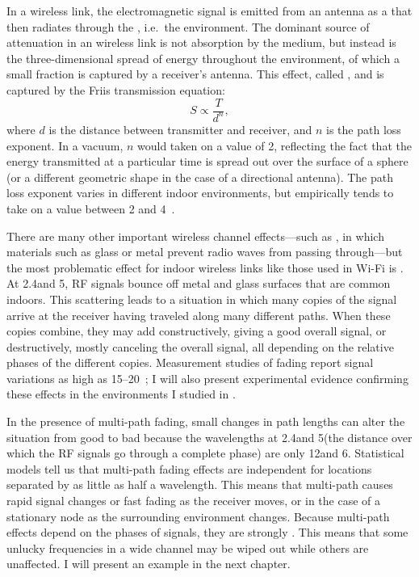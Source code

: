 In a wireless link, the electromagnetic signal is emitted from an antenna as a  that then radiates through the , i.e.\ the environment. The dominant source of attenuation in an wireless link is not absorption by the medium, but instead is the three-dimensional spread of energy throughout the environment, of which a small fraction is captured by a receiver's antenna. This effect, called , and is captured by the Friis transmission equation:
\begin{equation}
\label{eq:friis}
	S \propto \frac{T}{d^n},
\end{equation}
where $d$ is the distance between transmitter and receiver, and $n$ is the path loss exponent. In a vacuum, $n$ would taken on a value of 2, reflecting the fact that the energy transmitted at a particular time is spread out over the surface of a sphere (or a different geometric shape in the case of a directional antenna). The path loss exponent varies in different indoor environments, but empirically tends to take on a value between 2 and 4~\cite{Sklar}.

There are many other important wireless channel effects---such as , in which materials such as glass or metal prevent radio waves from passing through---but the most problematic effect for indoor wireless links like those used in Wi-Fi is . At 2.4\GHz and 5\GHz, RF signals bounce off metal and glass surfaces that are common indoors. This scattering leads to a situation in which many copies of the signal arrive at the receiver having traveled along many different paths. When these copies combine, they may add constructively, giving a good overall signal, or destructively, mostly canceling the overall signal, all depending on the relative phases of the different copies. Measurement studies of fading report signal variations as high as 15--20\dB~\cite{Judd_CHARM}; I will also present experimental evidence confirming these effects in the environments I studied in .

In the presence of multi-path fading, small changes in path lengths can alter the situation from good to bad because the wavelengths at 2.4\GHz and 5\GHz (the distance over which the RF signals go through a complete phase) are only 12\cm and 6\cm. Statistical models tell us that multi-path fading effects are independent for locations separated by as little as half a wavelength. This means that multi-path causes rapid signal changes or fast fading as the receiver moves, or in the case of a stationary node as the surrounding environment changes. Because multi-path effects depend on the phases of signals, they are strongly . This means that some unlucky frequencies in a wide channel may be wiped out while others are unaffected. I will present an example in the next chapter.

